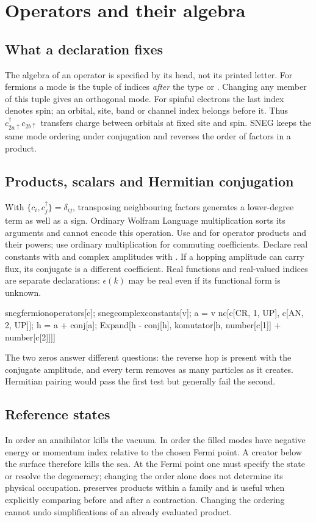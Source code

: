 \chapter{Operators and their algebra}
\section{What a declaration fixes}
The algebra of an operator is specified by its head, not its printed
letter. For fermions a mode is the tuple of indices \emph{after}
the type  or . Changing any member of this tuple gives
an orthogonal mode. For spinful electrons the last index denotes spin;
an orbital, site, band or channel index belongs before it. Thus
$c^\dagger_{2a\uparrow}c_{2b\uparrow}$ transfers charge between
orbitals at fixed site and spin. SNEG keeps the same mode ordering
under conjugation and reverses the order of factors in a product.

\section{Products, scalars and Hermitian conjugation}
With $\{c_i,c_j^\dagger\}=\delta_{ij}$, transposing neighbouring
factors generates a lower-degree term as well as a sign. Ordinary
Wolfram Language multiplication sorts its arguments and cannot encode
this operation. Use  and  for operator
products and their powers; use ordinary multiplication for commuting
coefficients. Declare real constants with  and
complex amplitudes with . If a hopping
amplitude can carry flux, its conjugate is a different coefficient.
Real functions and real-valued indices are separate declarations:
$\epsilon(k)$ may be real even if its functional form is unknown.
\begin{wl}
snegfermionoperators[c];
snegcomplexconstants[v];
a = v nc[c[CR, 1, UP], c[AN, 2, UP]];
h = a + conj[a];
Expand[{h - conj[h], komutator[h, number[c[1]] + number[c[2]]]}]
\end{wl}
The two zeros answer different questions: the reverse hop is present
with the conjugate amplitude, and every term removes as many particles
as it creates. Hermitian pairing would pass the first test but generally
fail the second.

\section{Reference states}
In  order an annihilator kills the vacuum. In  order
the filled modes have negative energy or momentum index relative to
the chosen Fermi point. A creator below the surface therefore kills
the sea. At the Fermi point one must specify the state or resolve the
degeneracy; changing the order alone does not determine its physical
occupation.  preserves products within a family and is useful
when explicitly comparing before and after a contraction. Changing
the ordering cannot undo simplifications of an already evaluated product.

